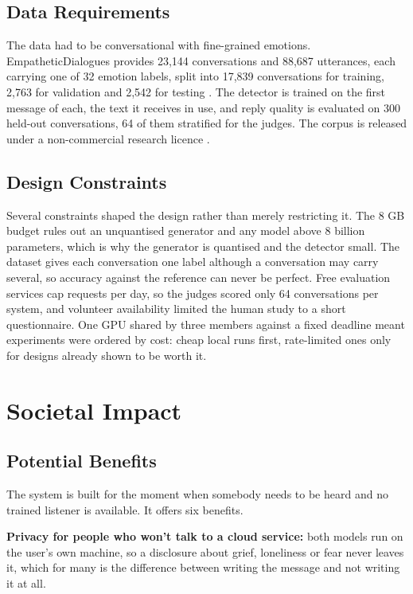 \subsection{Data Requirements}

The data had to be conversational with fine-grained emotions. EmpatheticDialogues provides 23,144 conversations and 88,687 utterances, each carrying one of 32 emotion labels, split into 17,839 conversations for training, 2,763 for validation and 2,542 for testing \cite{rashkin2019}. The detector is trained on the first message of each, the text it receives in use, and reply quality is evaluated on 300 held-out conversations, 64 of them stratified for the judges. The corpus is released under a non-commercial research licence \cite{ed_github}.

\subsection{Design Constraints}

Several constraints shaped the design rather than merely restricting it. The 8 GB budget rules out an unquantised generator and any model above 8 billion parameters, which is why the generator is quantised and the detector small. The dataset gives each conversation one label although a conversation may carry several, so accuracy against the reference can never be perfect. Free evaluation services cap requests per day, so the judges scored only 64 conversations per system, and volunteer availability limited the human study to a short questionnaire. One GPU shared by three members against a fixed deadline meant experiments were ordered by cost: cheap local runs first, rate-limited ones only for designs already shown to be worth it.

\section{Societal Impact}
\label{sec:3.2}

\subsection{Potential Benefits}

The system is built for the moment when somebody needs to be heard and no trained listener is available. It offers six benefits.

\textbf{Privacy for people who won't talk to a cloud service:} both models run on the user's own machine, so a disclosure about grief, loneliness or fear never leaves it, which for many is the difference between writing the message and not writing it at all.

